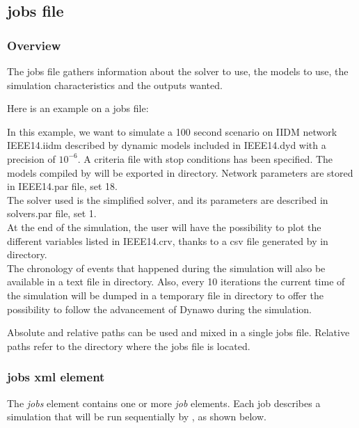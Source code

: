 \documentclass[a4paper, 12pt]{report}
\begin{document}
\subsection{jobs file}

\subsubsection{Overview}
The jobs file gathers information about the solver to use, the models to use, the simulation characteristics and the outputs wanted.

Here is an example on a jobs file:


In this example, we want to simulate a 100 second scenario on IIDM network
IEEE14.iidm described by dynamic models included in IEEE14.dyd with a precision
of $10^{-6}$. A criteria file with stop conditions has been specified.
The models compiled by \Dynawo will be exported in  directory. Network parameters are stored in IEEE14.par file, set 18. \\

The solver used is the simplified solver, and its parameters are described in solvers.par file, set 1. \\

At the end of the simulation, the user will have the possibility to plot the different variables listed in IEEE14.crv, thanks to a csv file generated by \Dynawo in  directory. \\

The chronology of events that happened during the simulation will also be
available in a text file in  directory. Also, every 10
iterations the current time of the simulation will be dumped in a
temporary file in  directory to offer the possibility to follow the advancement of Dynawo during the simulation.

Absolute and relative paths can be used and mixed in a single jobs file. Relative paths refer to the directory where the jobs file is located.

\subsubsection{jobs xml element}

The \textit{jobs} element contains one or more \textit{job} elements. Each job describes a simulation that will be run sequentially by \Dynawo, as shown below.
\end{document}
